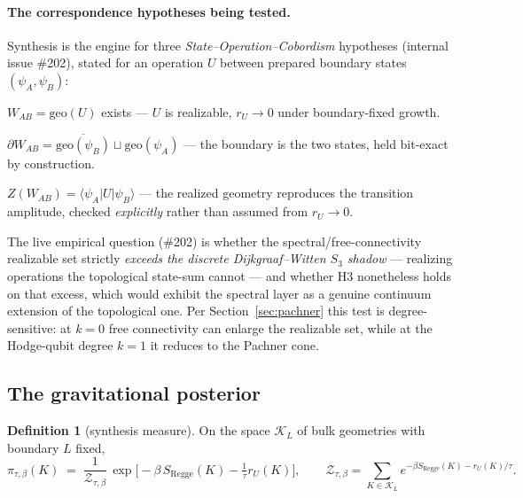 \documentclass[11pt]{article}
\newcommand{\KK}{\mathcal{K}}
\newcommand{\ket}[1]{\lvert #1 \rangle}
\newcommand{\bra}[1]{\langle #1 \rvert}
\newcommand{\bd}{\partial}
\theoremstyle{definition}
\newtheorem{definition}{Definition}[section]
\theoremstyle{plain}
\begin{document}
\paragraph{The correspondence hypotheses being tested.}
Synthesis is the engine for three \emph{State--Operation--Cobordism} hypotheses (internal
issue \#202), stated for an operation $U$ between prepared boundary states
$(\psi_A,\psi_B)$:
\begin{description}[leftmargin=3.2em,style=nextline,itemsep=2pt]
\item[\textnormal{(H1)} Realizable] $W_{AB}=\mathrm{geo}(U)$ exists --- $U$ is realizable,
$r_U\to0$ under boundary-fixed growth.
\item[\textnormal{(H2)} Boundary] $\bd W_{AB}=\overline{\mathrm{geo}(\psi_B)}\sqcup
\mathrm{geo}(\psi_A)$ --- the boundary is the two states, held bit-exact by construction.
\item[\textnormal{(H3)} Amplitude] $Z(W_{AB})=\bra{\psi_A}U\ket{\psi_B}$ --- the realized
geometry reproduces the transition amplitude, checked \emph{explicitly} rather than assumed
from $r_U\to0$.
\end{description}
The live empirical question (\#202) is whether the spectral/free-connectivity realizable set
strictly \emph{exceeds the discrete Dijkgraaf--Witten $S_3$ shadow} --- realizing operations
the topological state-sum cannot --- and whether H3 nonetheless holds on that excess, which
would exhibit the spectral layer as a genuine continuum extension of the topological one. Per
Section~\ref{sec:pachner} this test is degree-sensitive: at $k=0$ free connectivity can
enlarge the realizable set, while at the Hodge-qubit degree $k=1$ it reduces to the Pachner
cone.

\subsection{The gravitational posterior}

\begin{definition}[synthesis measure]
On the space $\KK_L$ of bulk geometries with boundary $L$ fixed,
\begin{equation}
\pi_{\tau,\beta}(K)\;=\;\frac{1}{\mathcal{Z}_{\tau,\beta}}\,
\exp\!\Big[-\beta\,S_{\mathrm{Regge}}(K)-\tfrac{1}{\tau}r_U(K)\Big],
\qquad
\mathcal{Z}_{\tau,\beta}=\sum_{K\in\KK_L} e^{-\beta S_{\mathrm{Regge}}(K)-r_U(K)/\tau}.
\end{equation}
\end{definition}
\end{document}

